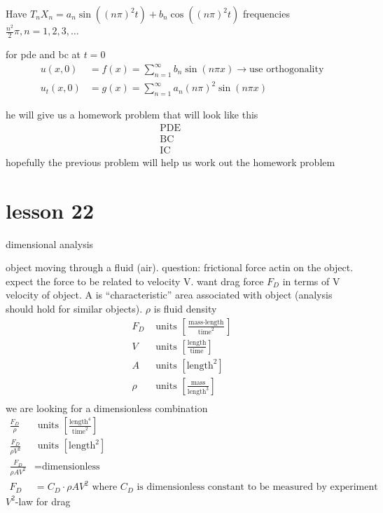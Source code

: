 \documentclass{article}
\begin{document}
Have $T_nX_n=a_n\sin((n\pi)^2t)+b_n\cos((n\pi)^2t)$ frequencies $\frac{n^2}{2}\pi, n=1,2,3,\dots$

for pde and bc at $t=0$
\begin{align*}
  u(x,0)&=f(x)=\sum\limits_{n=1}^\infty{b_n\sin(n\pi x)}\to\text{use orthogonality}\\
  u_t(x,0)&=g(x)=\sum\limits_{n=1}^\infty{a_n(n\pi)^2\sin(n\pi x)}
\end{align*}


he will give us a homework problem that will look like this
\begin{align*}
  \text{PDE}&&&\\
  \text{BC}&&&\\
  \text{IC}&&&
\end{align*}
hopefully the previous problem will help us work out the homework problem

\section*{lesson 22}
dimensional analysis

object moving through a fluid (air). question: frictional force actin on the object. expect the force to be related to velocity V. want drag force $F_D$ in terms of V velocity of object. A is ``characteristic'' area associated with object (analysis should hold for similar objects). $\rho$ is fluid density
\begin{align*}
  F_D&\text{ units }\left[\frac{\text{mass}\cdot\text{length}}{\text{time}^2}\right]\\
  V&\text{ units }\left[\frac{\text{length}}{\text{time}}\right]\\
  A&\text{ units }\left[\text{length}^2\right]\\
  \rho&\text{ units }\left[\frac{\text{mass}}{\text{length}^3}\right]\\
\end{align*}
we are looking for a dimensionless combination
\begin{align*}
  \frac{F_D}{\rho}&\text{ units }\left[\frac{\text{length}^4}{\text{time}^2}\right]\\
  \frac{F_D}{\rho V^2}&\text{ units }\left[\text{length}^2\right]\\
  \frac{F_D}{\rho AV^2}&=\text{dimensionless}\\
  F_D&=C_D\cdot\rho AV^2\text{ where $C_D$ is dimensionless constant to be measured by experiment}
\end{align*}
$V^2$-law for drag
\end{document}

